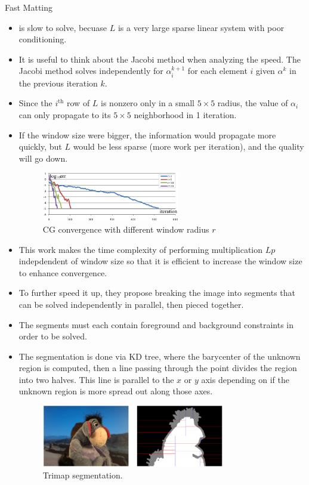 \documentclass{beamer}
\begin{document}
\begin{frame}[allowframebreaks]{Fast Matting \cite{he2010fast}}
 \begin{itemize}
  \item \cite{levin2008closed} is slow to solve, becuase $L$ is a very large
        sparse linear system with poor conditioning.
  \item It is useful to think about the Jacobi method when analyzing the speed.
        The Jacobi method solves independently for $\alpha^{k+1}_i$ for each
        element $i$ given $\alpha^k$ in the previous iteration $k$.
  \item Since the $i^\text{th}$ row of $L$ is nonzero only in a small $5 \times 5$
        radius, the value of $\alpha_i$ can only propagate to its $5 \times 5$
        neighborhood in 1 iteration.
  \item If the window size were bigger, the information would propagate more
        quickly, but $L$ would be less sparse (more work per iteration), and
        the quality will go down.
  \begin{figure}
   \includegraphics[width=6cm]{images/fastmatting_convergence.png}
   \caption{CG convergence with different window radius $r$}
  \end{figure}
  \item This work makes the time complexity of performing multiplication $Lp$ indepdendent of
        window size so that it is efficient to increase the window size to
        enhance convergence.
  \item To further speed it up, they propose breaking the image into segments
        that can be solved independently in parallel, then pieced together.
  \item The segments must each contain foreground and background constraints
        in order to be solved.
  \item The segmentation is done via KD tree, where the barycenter of the
        unknown region is computed, then a line passing through the point
        divides the region into two halves. This line is parallel to the
        $x$ or $y$ axis depending on if the unknown region is more spread
        out along those axes.
  \begin{figure}
   \includegraphics[width=8cm]{images/fastmatting_segmentation.png}
   \caption{Trimap segmentation.}
  \end{figure}
 \end{itemize}
\end{frame}
\end{document}
